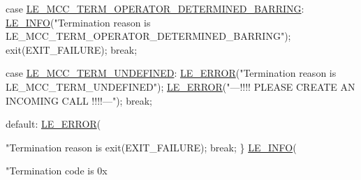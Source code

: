 \begin{DoxyCodeInclude}
{{            \textcolor{keywordflow}{case} \hyperlink{le__mcc__interface_8h_abda706f723ba619f9bc460bcc9a4960da4f91eb4e6eec8ed84c3b4b6d1ab949fd}{LE\_MCC\_TERM\_OPERATOR\_DETERMINED\_BARRING}:
                \hyperlink{le__log_8h_a23e6d206faa64f612045d688cdde5808}{LE\_INFO}(\textcolor{stringliteral}{"Termination reason is LE\_MCC\_TERM\_OPERATOR\_DETERMINED\_BARRING"});
                exit(EXIT\_FAILURE);
                \textcolor{keywordflow}{break};

            \textcolor{keywordflow}{case} \hyperlink{le__mcc__interface_8h_abda706f723ba619f9bc460bcc9a4960da3dbb90bf0628971a6afbd4773fc97c1a}{LE\_MCC\_TERM\_UNDEFINED}:
                \hyperlink{le__log_8h_a353590f91b3143a7ba3a416ae5a50c3d}{LE\_ERROR}(\textcolor{stringliteral}{"Termination reason is LE\_MCC\_TERM\_UNDEFINED"});
                \hyperlink{le__log_8h_a353590f91b3143a7ba3a416ae5a50c3d}{LE\_ERROR}(\textcolor{stringliteral}{"---!!!! PLEASE CREATE AN INCOMING CALL !!!!---"});
                \textcolor{keywordflow}{break};

            \textcolor{keywordflow}{default}:
                \hyperlink{le__log_8h_a353590f91b3143a7ba3a416ae5a50c3d}{LE\_ERROR}(\textcolor{stringliteral}{"Termination reason is %
                exit(EXIT\_FAILURE);
                \textcolor{keywordflow}{break};
        \}
        \hyperlink{le__log_8h_a23e6d206faa64f612045d688cdde5808}{LE\_INFO}(\textcolor{stringliteral}{"Termination code is 0x%

}}}}
\end{DoxyCodeInclude}
